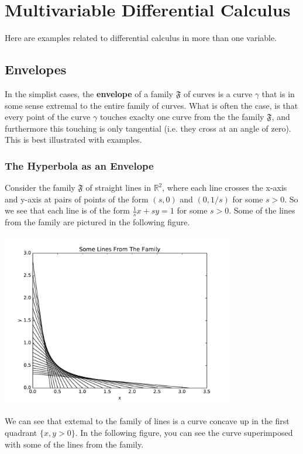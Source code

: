 \section{Multivariable Differential Calculus}

Here are examples related to differential calculus in more than one variable.

\subsection{Envelopes}

In the simplist cases, the \textbf{envelope} of a family \(\mathfrak F\) of curves is a curve \(\gamma\) that is in some sense extremal to the entire family of curves. 
What is often the case, is that every point of the curve \(\gamma\) touches exaclty one curve from the the family \(\mathfrak F\), and furthermore this touching is only tangential (i.e. they cross at an angle of zero). 
This is best illustrated with examples. 

\subsubsection{The Hyperbola as an Envelope}

Consider the family \(\mathfrak F\) of straight lines in \(\mathbb R^2\), where each line crosses the x-axis and y-axis at pairs of points of the form \((s,0)\) and \((0, 1/s)\) for some \(s > 0\). 
So we see that each line is of the form \(\frac{1}{s} x + s y = 1\) for some \(s > 0\).
Some of the lines from the family are pictured in the following figure.

\includegraphics[width = 4.0in]{multiVarDiffCalc/hyperbolaFamily.pdf}

We can see that extemal to the family of lines is a curve concave up in the first quadrant \(\{x, y > 0\}\). In the following figure, you can see the curve superimposed with some of the lines from the family.

